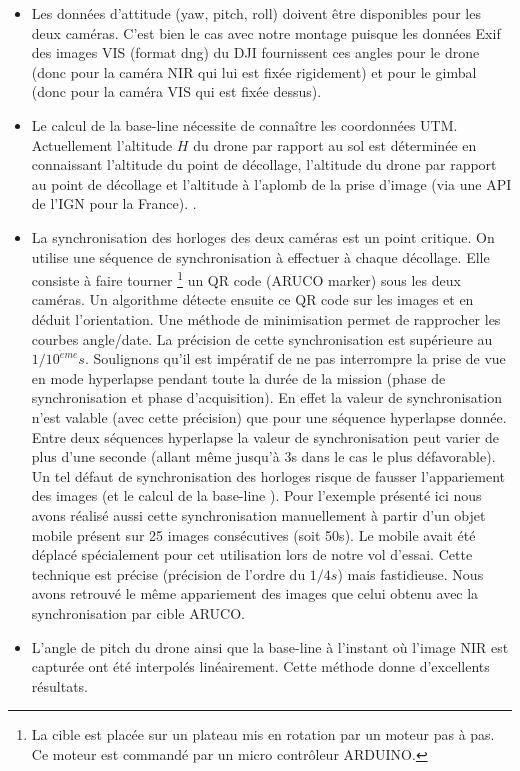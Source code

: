 \documentclass[a4paper,11pt]{report}
\begin{document}
\begin{itemize}
	\item Les données d'attitude  (yaw, pitch, roll) doivent être disponibles pour les deux caméras. C'est bien le cas avec notre montage puisque les données Exif des images VIS (format dng) du DJI fournissent ces angles pour le drone (donc pour la caméra NIR qui lui est fixée rigidement) et pour le gimbal (donc pour la caméra VIS qui est fixée dessus).\\  
	\item Le calcul de la \og base-line \fg{} nécessite de connaître les coordonnées UTM. Actuellement l'altitude $H$ du drone par rapport au sol est déterminée en connaissant l'altitude du point de décollage, l'altitude du drone par rapport au point de décollage et l'altitude à l'aplomb de la prise d'image (via une API de l'IGN pour la France). .\\
	\item La synchronisation des horloges des deux caméras est un point critique. On utilise une séquence de synchronisation à effectuer à chaque décollage. Elle consiste à faire tourner
	\footnote{La cible est placée sur un plateau mis en rotation par un moteur pas à pas. Ce moteur est commandé par un micro contrôleur ARDUINO.} un QR code (ARUCO marker) sous les deux caméras. Un algorithme détecte ensuite ce QR code sur les images et en déduit l'orientation. Une méthode de minimisation permet de rapprocher  les courbes angle/date. La  précision de cette synchronisation est supérieure au $1/10^{\grave{e}me}s$.  Soulignons qu'il est impératif de ne pas interrompre la prise de vue en mode hyperlapse pendant toute la durée de la mission (phase de synchronisation et phase d'acquisition). En effet la valeur de synchronisation n'est valable (avec cette précision) que pour une séquence hyperlapse donnée. Entre deux séquences hyperlapse la valeur de synchronisation peut varier de plus d'une seconde (allant même jusqu'à 3s dans le cas le plus défavorable).
	Un tel défaut de synchronisation des horloges risque de fausser l'appariement des images (et le calcul de la  \og base-line \fg{}).
	Pour l'exemple présenté ici nous avons réalisé aussi cette synchronisation manuellement à partir d'un objet mobile présent sur 25 images consécutives (soit 50s). Le mobile avait été déplacé spécialement pour cet utilisation lors de notre vol d'essai. Cette technique est précise (précision de l'ordre du $1/4 s$) mais fastidieuse. Nous avons retrouvé le même appariement des images que celui obtenu avec la synchronisation par cible ARUCO. \\
	\item L'angle de pitch du drone ainsi que la \og base-line \fg{} à l'instant où l'image NIR est capturée ont été  interpolés linéairement. Cette méthode donne d'excellents résultats.\\
\end{itemize}
\end{document}

